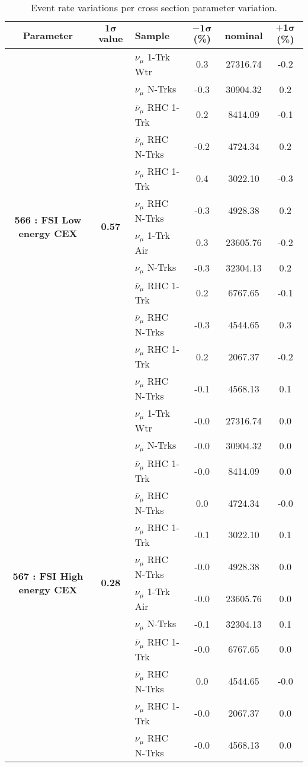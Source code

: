 \addtocounter{table}{-1}
\begin{table}[ht!]
\centering
\begin{tabular}{ c  c  l  c  c  c }
\midrule[1.3pt]
\textbf{Parameter} & \textbf{$\mathbf{1\sigma}$ value} & \textbf{Sample} & \textbf{$\mathbf{-1\sigma}$ (\%)}  &  \textbf{nominal}  &  \textbf{$\mathbf{+1\sigma}$ (\%)} \\
\midrule[1.3pt]
\multirow{12}{*}{\textbf{566 : FSI Low energy CEX}} & \multirow{12}{*}{\textbf{0.57}} & $\nu_\mu$ 1-Trk Wtr &   0.3 &  27316.74 &   -0.2 \\ 
 &  & $\nu_\mu$ N-Trks &   -0.3 &  30904.32 &   0.2 \\ 
 &  & $\overline{\nu}_\mu$ RHC 1-Trk &   0.2 &  8414.09 &   -0.1 \\ 
 &  & $\overline{\nu}_\mu$ RHC N-Trks &   -0.2 &  4724.34 &   0.2 \\ 
 &  & $\nu_\mu$ RHC 1-Trk &   0.4 &  3022.10 &   -0.3 \\ 
 &  & $\nu_\mu$ RHC N-Trks &   -0.3 &  4928.38 &   0.2 \\ 
 &  & $\nu_\mu$ 1-Trk Air &   0.3 &  23605.76 &   -0.2 \\ 
 &  & $\nu_\mu$ N-Trks &   -0.3 &  32304.13 &   0.2 \\ 
 &  & $\overline{\nu}_\mu$ RHC 1-Trk &   0.2 &  6767.65 &   -0.1 \\ 
 &  & $\overline{\nu}_\mu$ RHC N-Trks &   -0.3 &  4544.65 &   0.3 \\ 
 &  & $\nu_\mu$ RHC 1-Trk &   0.2 &  2067.37 &   -0.2 \\ 
 &  & $\nu_\mu$ RHC N-Trks &   -0.1 &  4568.13 &   0.1 \\ 
\midrule[1.3pt]
\multirow{12}{*}{\textbf{567 : FSI High energy CEX}} & \multirow{12}{*}{\textbf{0.28}} & $\nu_\mu$ 1-Trk Wtr &   -0.0 &  27316.74 &   0.0 \\ 
 &  & $\nu_\mu$ N-Trks &   -0.0 &  30904.32 &   0.0 \\ 
 &  & $\overline{\nu}_\mu$ RHC 1-Trk &   -0.0 &  8414.09 &   0.0 \\ 
 &  & $\overline{\nu}_\mu$ RHC N-Trks &   0.0 &  4724.34 &   -0.0 \\ 
 &  & $\nu_\mu$ RHC 1-Trk &   -0.1 &  3022.10 &   0.1 \\ 
 &  & $\nu_\mu$ RHC N-Trks &   -0.0 &  4928.38 &   0.0 \\ 
 &  & $\nu_\mu$ 1-Trk Air &   -0.0 &  23605.76 &   0.0 \\ 
 &  & $\nu_\mu$ N-Trks &   -0.1 &  32304.13 &   0.1 \\ 
 &  & $\overline{\nu}_\mu$ RHC 1-Trk &   -0.0 &  6767.65 &   0.0 \\ 
 &  & $\overline{\nu}_\mu$ RHC N-Trks &   0.0 &  4544.65 &   -0.0 \\ 
 &  & $\nu_\mu$ RHC 1-Trk &   -0.0 &  2067.37 &   0.0 \\ 
 &  & $\nu_\mu$ RHC N-Trks &   -0.0 &  4568.13 &   0.0 \\ 
\midrule[1.3pt]
\end{tabular}
\centering
\caption*{Event rate variations per cross section parameter variation.}
\end{table}
